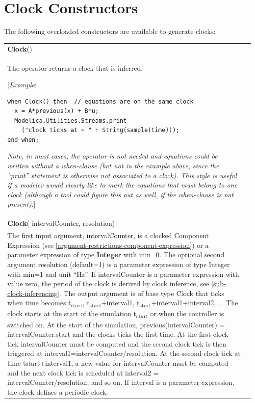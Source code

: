 \documentclass[10pt,a4paper]{report}
\def\doublelabel#1{\label{#1}}
\begin{document}
\section{Clock Constructors}\doublelabel{clock-constructors}

The following overloaded constructors are available to generate clocks:

\begin{longtable}[]{|p{3cm}|p{11cm}|}
\hline \endhead
\textbf{Clock}()
&
\begin{tabular}{@{}p{11cm}@{}}
\textbf{Inferred Clock}\\

The operator returns a clock that is inferred.

{[}\emph{Example}:
\begin{lstlisting}[language=modelica]
when Clock() then  // equations are on the same clock     
  x = A*previous(x) + B*u;     
  Modelica.Utilities.Streams.print          
    ("clock ticks at = " + String(sample(time)));   
end when; 
\end{lstlisting}
\emph{Note, in most cases, the operator is not needed and equations
could be written without a when-clause (but not in the example above,
since the ``print'' statement is otherwise not associated to a clock).
This style is useful if a modeler would clearly like to mark the
equations that must belong to one clock (although a tool could figure
this out as well, if the when-clause is not present).}{]}
\end{tabular}\\ \hline
\textbf{Clock}( intervalCounter,
resolution)
&
\begin{tabular}{@{}p{11cm}@{}}
\textbf{Clock with Rational Interval}\\

The first input argument, intervalCounter, is a clocked Component
Expression (see \ref{argument-restrictions-component-expression}) or a parameter expression of type
\textbf{Integer} with min=0. The optional second argument resolution
(default=1) is a parameter expression of type Integer with min=1 and
unit ``Hz''. If intervalCounter is a parameter expression with value
zero, the period of the clock is derived by clock inference, see 
\ref{sub-clock-inferencing}. The output argument is of base type Clock that ticks when time
becomes t\textsubscript{start}, t\textsubscript{start}+interval1,
t\textsubscript{start}+interval1+interval2, ... The clock starts at the
start of the simulation t\textsubscript{start} or when the controller is
switched on. At the start of the simulation, previous(intervalCounter) =
intervalCounter.start and the clocks ticks the first time. At the first
clock tick intervalCounter must be computed and the second clock tick is
then triggered at interval1=intervalCounter/resolution. At the second
clock tick at time tstart+interval1, a new value for intervalCounter
must be computed and the next clock tick is scheduled at interval2 =
intervalCounter/resolution, and so on. If interval is a parameter
expression, the clock defines a periodic clock.


\end{tabular}
\end{longtable}
\end{document}
